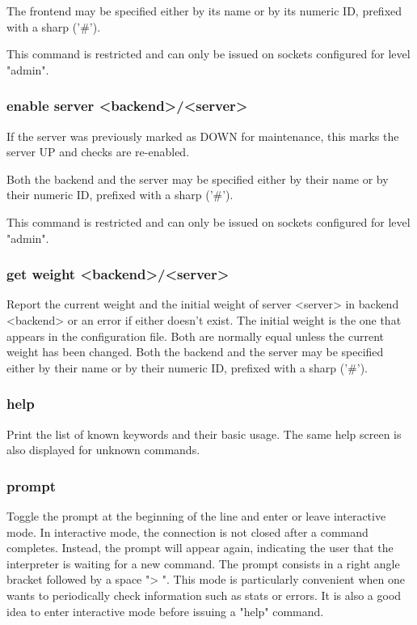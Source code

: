   The frontend may be specified either by its name or by its numeric ID,
  prefixed with a sharp ('\#').

  This command is restricted and can only be issued on sockets configured for
  level "admin".

\subsubsection[enable server]{enable server <backend>/<server>}
  If the server was previously marked as DOWN for maintenance, this marks the
  server UP and checks are re-enabled.

  Both the backend and the server may be specified either by their name or by
  their numeric ID, prefixed with a sharp ('\#').

  This command is restricted and can only be issued on sockets configured for
  level "admin".

\subsubsection[get weight]{get weight <backend>/<server>}
  Report the current weight and the initial weight of server <server> in
  backend <backend> or an error if either doesn't exist. The initial weight is
  the one that appears in the configuration file. Both are normally equal
  unless the current weight has been changed. Both the backend and the server
  may be specified either by their name or by their numeric ID, prefixed with a
  sharp ('\#').

\subsubsection[help]{help}
  Print the list of known keywords and their basic usage. The same help screen
  is also displayed for unknown commands.

\subsubsection[prompt]{prompt}
  Toggle the prompt at the beginning of the line and enter or leave interactive
  mode. In interactive mode, the connection is not closed after a command
  completes. Instead, the prompt will appear again, indicating the user that
  the interpreter is waiting for a new command. The prompt consists in a right
  angle bracket followed by a space "> ". This mode is particularly convenient
  when one wants to periodically check information such as stats or errors.
  It is also a good idea to enter interactive mode before issuing a "help"
  command.

